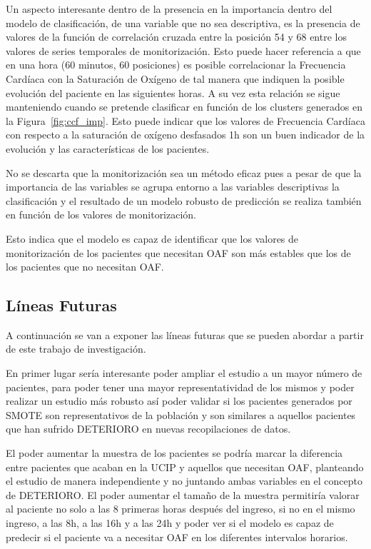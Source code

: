 {Un aspecto interesante dentro de la presencia en la importancia dentro del modelo de clasificación, de una variable que no sea descriptiva, es la presencia de valores de la función de correlación cruzada entre la posición 54 y 68 entre los valores de series temporales de monitorización. Esto puede hacer referencia a que en una hora (60 minutos, 60 posiciones) es posible correlacionar la Frecuencia Cardíaca con la Saturación de Oxígeno de tal manera que indiquen la posible evolución del paciente en las siguientes horas. A su vez esta relación se sigue manteniendo cuando se pretende clasificar en función de los clusters generados en la Figura~\ref{fig:ccf_imp}. Esto puede indicar que los valores de Frecuencia Cardíaca con respecto a la saturación de oxígeno desfasados 1h son un buen indicador de la evolución y las características de los pacientes.

No se descarta que la monitorización sea un método eficaz pues a pesar de que la importancia de las variables se agrupa entorno a las variables descriptivas la clasificación y el resultado de un modelo robusto de predicción se realiza también en función de los valores de monitorización.  

Esto indica que el modelo es capaz de identificar que los valores de monitorización de los pacientes que necesitan OAF son más estables que los de los pacientes que no necesitan OAF.



\subsection{Líneas Futuras}\label{sec:líneas-futuras}

A continuación se van a exponer las líneas futuras que se pueden abordar a partir de este trabajo de investigación.

En primer lugar sería interesante poder ampliar el estudio a un mayor número de pacientes, para poder tener una mayor representatividad de los mismos y poder realizar un estudio más robusto así poder validar si los pacientes generados por SMOTE son representativos de la población y son similares a aquellos pacientes que han sufrido DETERIORO en nuevas recopilaciones de datos.

El poder aumentar la muestra de los pacientes se podría marcar la diferencia entre pacientes que acaban en la UCIP y aquellos que necesitan OAF, planteando el estudio de manera independiente y no juntando ambas variables en el concepto de DETERIORO. El poder aumentar el tamaño de la muestra permitiría valorar al paciente no solo a las 8 primeras horas después del ingreso, si no en el mismo ingreso, a las 8h, a las 16h y a las 24h y poder ver si el modelo es capaz de predecir si el paciente va a necesitar OAF en los diferentes intervalos horarios.

}
